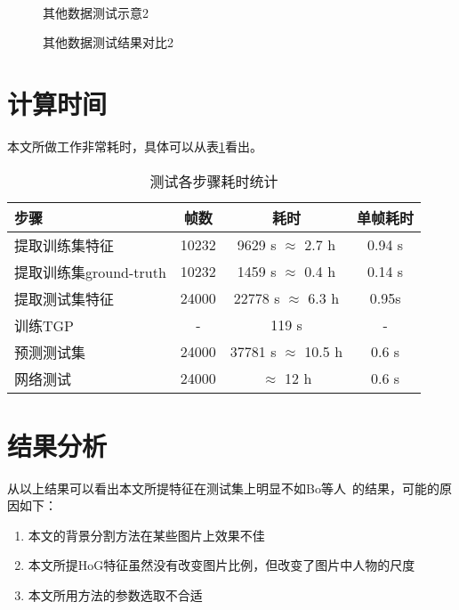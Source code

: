 \begin{figure}[htbp]
  \centering
  \hspace{.5cm}
  \hspace{.5cm}
  \\
  \hspace{.5cm}
  \hspace{.5cm}
  \caption{其他数据测试示意2}\label{fig:mindance}
\end{figure}

\begin{figure}[H]
  \centering
  \hspace{2cm}
  \caption{其他数据测试结果对比2}\label{fig:mindance_result}
\end{figure}

\section{计算时间}
本文所做工作非常耗时，具体可以从表\ref{tab:time}看出。
\begin{table}[H]
  \centering
  \caption{测试各步骤耗时统计}
  \label{tab:time}
    \begin{tabular}{lccc}
      \toprule[1.5pt]
      步骤 & 帧数 & 耗时 & 单帧耗时\\\midrule[1pt]
      提取训练集特征 & 10232 & 9629 s $\approx$ 2.7 h & 0.94 s \\
      提取训练集ground-truth & 10232 & 1459 s $\approx$ 0.4 h & 0.14 s \\
      提取测试集特征 & 24000 & 22778 s $\approx$ 6.3 h & 0.95s\\
      训练TGP & - & 119 s & - \\
      预测测试集 & 24000 & 37781 s $\approx$ 10.5 h & 0.6 s\\
      网络测试 & 24000 & $\approx$ 12 h& 0.6 s\\
      \bottomrule[1.5pt]
    \end{tabular}
\end{table}

\section{结果分析}
\label{sec:analysis}
从以上结果可以看出本文所提特征在测试集上明显不如Bo等人~\cite{bo2010twin}的结果，可能的原因如下：
\begin{enumerate}
  \item 本文的背景分割方法在某些图片上效果不佳
  \item 本文所提HoG特征虽然没有改变图片比例，但改变了图片中人物的尺度
  \item 本文所用方法的参数选取不合适
\end{enumerate}

